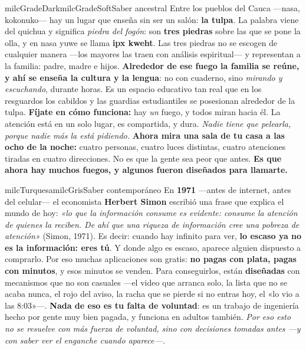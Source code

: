 \documentclass[11pt,letterpaper]{article}
\begin{document}
\begin{softbox}{milcGradeDark}{milcGradeSoft}{Saber ancestral}
Entre los pueblos del Cauca ---nasa, kokonuko--- hay un lugar que enseña sin ser un salón: \textbf{la tulpa}. La palabra viene del quichua y significa \emph{piedra del fogón}: son \textbf{tres piedras} sobre las que se pone la olla, y en nasa yuwe se llama \textbf{ipx kweht}. Las tres piedras no se escogen de cualquier manera ---los mayores las traen con análisis espiritual--- y representan a la familia: padre, madre e hijos. \textbf{Alrededor de ese fuego la familia se reúne, y ahí se enseña la cultura y la lengua}: no con cuaderno, sino \emph{mirando y escuchando}, durante horas. Es un espacio educativo tan real que en los resguardos los cabildos y las guardias estudiantiles se posesionan alrededor de la tulpa. \textbf{Fíjate en cómo funciona:} hay \emph{un} fuego, y todos miran hacia él. La atención está en un solo lugar, es compartida, y dura. \emph{Nadie tiene que pelearla, porque nadie más la está pidiendo.} \textbf{Ahora mira una sala de tu casa a las ocho de la noche:} cuatro personas, cuatro luces distintas, cuatro atenciones tiradas en cuatro direcciones. No es que la gente sea peor que antes. \textbf{Es que ahora hay muchos fuegos, y algunos fueron diseñados para llamarte.}
\end{softbox}

\begin{softbox}{milcTurquesa}{milcGris}{Saber contemporáneo}
En \textbf{1971} ---antes de internet, antes del celular--- el economista \textbf{Herbert Simon} escribió una frase que explica el mundo de hoy: \emph{«lo que la información consume es evidente: consume la atención de quienes la reciben. De ahí que una riqueza de información cree una pobreza de atención»} (Simon, 1971). Es decir: cuando hay infinito para ver, \textbf{lo escaso ya no es la información: eres tú}. Y donde algo es escaso, aparece alguien dispuesto a comprarlo. Por eso muchas aplicaciones son gratis: \textbf{no pagas con plata, pagas con minutos}, y esos minutos se venden. Para conseguirlos, están \textbf{diseñadas} con mecanismos que no son casuales ---el video que arranca solo, la lista que no se acaba nunca, el rojo del aviso, la racha que se pierde si no entras hoy, el «lo vio a las 8:03»---. \textbf{Nada de eso es tu falta de voluntad}: es un trabajo de ingeniería hecho por gente muy bien pagada, y funciona en adultos también. \emph{Por eso esto no se resuelve con más fuerza de voluntad, sino con decisiones tomadas antes ---y con saber ver el enganche cuando aparece---.}
\end{softbox}
\end{document}
